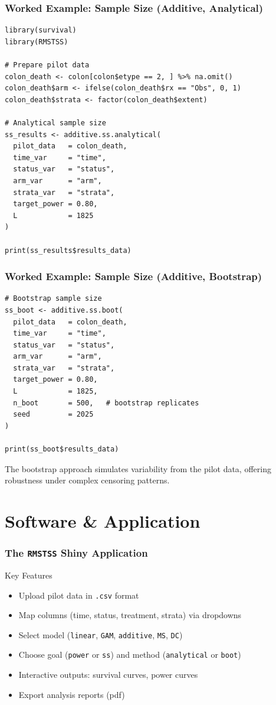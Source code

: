 \documentclass{beamer}
\begin{document}
\begin{frame}[fragile]
\frametitle{Worked Example: Sample Size (Additive, Analytical)}
\scriptsize
\begin{verbatim}
library(survival)
library(RMSTSS)

# Prepare pilot data
colon_death <- colon[colon$etype == 2, ] %>% na.omit()
colon_death$arm <- ifelse(colon_death$rx == "Obs", 0, 1)
colon_death$strata <- factor(colon_death$extent)

# Analytical sample size
ss_results <- additive.ss.analytical(
  pilot_data   = colon_death,
  time_var     = "time",
  status_var   = "status",
  arm_var      = "arm",
  strata_var   = "strata",
  target_power = 0.80,
  L            = 1825
)

print(ss_results$results_data)
\end{verbatim}
\end{frame}

\begin{frame}[fragile]
\frametitle{Worked Example: Sample Size (Additive, Bootstrap)}
\scriptsize
\begin{verbatim}
# Bootstrap sample size
ss_boot <- additive.ss.boot(
  pilot_data   = colon_death,
  time_var     = "time",
  status_var   = "status",
  arm_var      = "arm",
  strata_var   = "strata",
  target_power = 0.80,
  L            = 1825,
  n_boot       = 500,   # bootstrap replicates
  seed         = 2025
)

print(ss_boot$results_data)
\end{verbatim}

\small The bootstrap approach simulates variability from the pilot data, offering robustness under complex censoring patterns.
\end{frame}

\section{Software \& Application}
\begin{frame}
\frametitle{The \texttt{RMSTSS} Shiny Application}
\begin{block}{Key Features}
\begin{itemize}
  \item Upload pilot data in \texttt{.csv} format
  \item Map columns (time, status, treatment, strata) via dropdowns
  \item Select model (\texttt{linear}, \texttt{GAM}, \texttt{additive}, \texttt{MS}, \texttt{DC})
  \item Choose goal (\texttt{power} or \texttt{ss}) and method (\texttt{analytical} or \texttt{boot})
  \item Interactive outputs: survival curves, power curves
  \item Export analysis reports (pdf)
\end{itemize}
\end{block}
\end{frame}
\end{document}

